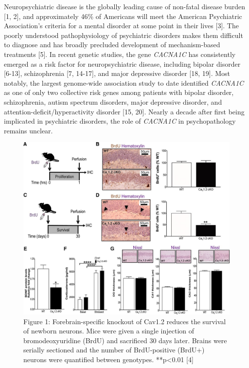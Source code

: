 \documentclass[]{article}
\date{}
\begin{document}
Neuropsychiatric disease is the globally leading cause of non-fatal disease burden {[}1,
2{]}, and approximately 46\% of Americans will meet the American
Psychiatric Association's criteria for a mental disorder at some point
in their lives {[}3{]}. 
The poorly understood pathophysiology of psychiatric disorders makes them 
difficult to diagnose and has broadly precluded development of mechanism-based treatments {[}5{]}. 
In recent genetic studies, the gene \emph{CACNA1C} has consistently emerged as a
risk factor for neuropsychiatric disease, including bipolar disorder
{[}6-13{]}, schizophrenia {[}7, 14-17{]}, and major depressive disorder
{[}18, 19{]}. 
Most notably, the largest genome-wide association study to
date identified \emph{CACNA1C} as one of only two collective risk genes
among patients with bipolar disorder, schizophrenia, autism spectrum
disorders, major depressive disorder, and
attention-deficit/hyperactivity disorder {[}15, 20{]}. 
Nearly a decade after first being implicated in psychiatric disorders, the role of
\emph{CACNA1C} in psychopathology remains unclear.

\begin{figure}[h]
\includegraphics{image.jpg}
	\caption{Figure 1: Forebrain-specific knockout of Cav1.2 reduces the survival of newborn neurons.
		Mice were given a single injection of bromodeoxyuridine (BrdU) and sacrificed 30 days later. Brains were serially sectioned and the number of BrdU-positive (BrdU+) neurons were quantified between genotypes. **p<0.01 [4]}
\end{figure}
\end{document}
